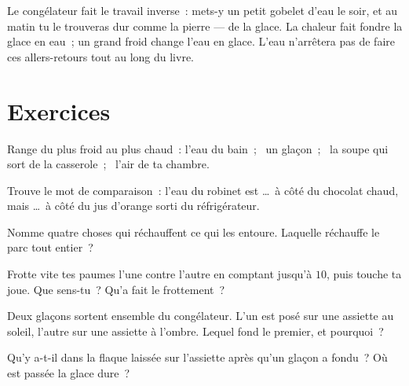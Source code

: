 \begin{example}\label{ex:g1:hot-and-cold:freezer}
Le congélateur fait le travail inverse~: mets-y un petit gobelet
d'eau le soir, et au matin tu le trouveras dur comme la pierre ---
de la glace. La chaleur fait fondre la glace en eau~; un grand froid
change l'eau en glace. L'eau n'arrêtera pas de faire ces
allers-retours tout au long du livre.
\end{example}

\section{Exercices}

\begin{exercise}[$\star$]\label{exo:g1:hot-and-cold:1}
Range du plus froid au plus chaud~: l'eau du bain~; \ un glaçon~; \ la
soupe qui sort de la casserole~; \ l'air de ta chambre.
\end{exercise}

\begin{exercise}[$\star$]\label{exo:g1:hot-and-cold:2}
Trouve le mot de comparaison~: l'eau du robinet est \dots\ à côté du
chocolat chaud, mais \dots\ à côté du jus d'orange sorti du
réfrigérateur.
\end{exercise}

\begin{exercise}[$\star$]\label{exo:g1:hot-and-cold:3}
Nomme quatre choses qui réchauffent ce qui les entoure. Laquelle
réchauffe le parc tout entier~?
\end{exercise}

\begin{exercise}[$\star$]\label{exo:g1:hot-and-cold:4}
Frotte vite tes paumes l'une contre l'autre en comptant jusqu'à $10$,
puis touche ta joue. Que sens-tu~? Qu'a fait le frottement~?
\end{exercise}

\begin{exercise}[$\star$]\label{exo:g1:hot-and-cold:5}
Deux glaçons sortent ensemble du congélateur. L'un est posé sur une
assiette au soleil, l'autre sur une assiette à l'ombre. Lequel fond
le premier, et pourquoi~?
\end{exercise}

\begin{exercise}[$\star$]\label{exo:g1:hot-and-cold:6}
Qu'y a-t-il dans la flaque laissée sur l'assiette après qu'un glaçon
a fondu~? Où est passée la glace dure~?
\end{exercise}

